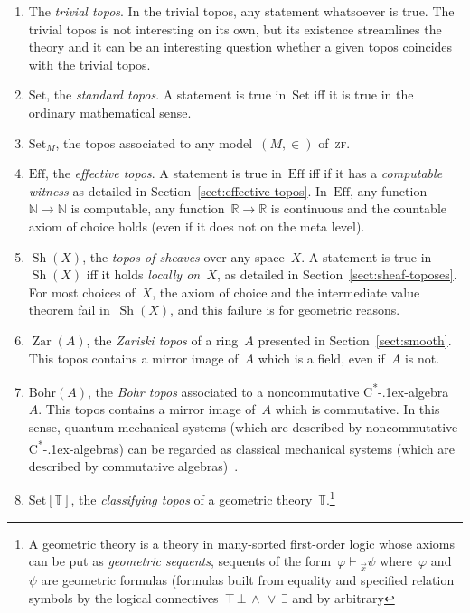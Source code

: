 \documentclass[oneside,reqno]{amsart}
\theoremstyle{definition}
\theoremstyle{plain}
\theoremstyle{remark}
\newcommand{\NN}{\mathbb{N}}
\newcommand{\TT}{\mathbb{T}}
\newcommand{\RR}{\mathbb{R}}
\DeclareMathOperator{\Sh}{Sh}
\DeclareMathOperator{\Zar}{Zar}
\newcommand{\Set}{\mathrm{Set}}
\newcommand{\Eff}{\mathrm{Ef{}f}}
\renewcommand{\_}{\mathpunct{.}\,}
\newcommand{\effective}{ef{}fective\xspace}
\newcommand{\?}{\,{:}\,}
\newcommand{\seq}[1]{\mathrel{\vdash\!\!\!_{#1}}}
\begin{document}
\begin{enumerate}
\item The \emph{trivial topos}. In the trivial topos, any statement whatsoever
is true. The trivial topos is not interesting on its own, but its existence
streamlines the theory and it can be an interesting question whether a given
topos coincides with the trivial topos.
\item $\Set$, the \emph{standard topos}. A statement is true in~$\Set$ iff it is true
in the ordinary mathematical sense.
\item $\Set_M$, the topos associated to any model~$(M,\in)$ of~\textsc{zf}.
\item $\Eff$, the \emph{\effective topos}. A statement is true in~$\Eff$ iff
if it has a \emph{computable witness} as detailed in
Section~\ref{sect:effective-topos}. In~$\Eff$, any function~$\NN \to \NN$ is
computable, any function~$\RR \to \RR$ is continuous and the countable axiom of
choice holds (even if it does not on the meta level).
\item $\Sh(X)$, the \emph{topos of sheaves} over any space~$X$. A statement is true
in~$\Sh(X)$ iff it holds \emph{locally on~$X$}, as detailed in
Section~\ref{sect:sheaf-toposes}. For most choices of~$X$, the
axiom of choice and the intermediate value theorem fail in~$\Sh(X)$, and this
failure is for geometric reasons.
\item $\Zar(A)$, the \emph{Zariski topos} of a ring~$A$ presented in
Section~\ref{sect:smooth}. This topos contains a mirror
image of~$A$ which is a field, even if~$A$ is not.
\item $\mathrm{Bohr}(A)$, the \emph{Bohr topos} associated to a noncommutative
C\textsuperscript{*}\kern-.1ex-algebra~$A$. This topos contains a mirror image
of~$A$ which is commutative. In this sense, quantum mechanical systems (which are
described by noncommutative C\textsuperscript{*}\kern-.1ex-algebras) can be
regarded as classical mechanical systems (which are described by commutative
algebras)~\cite{butterfield-hamilton-isham:bohr,heunen-landsman-spitters:aqt}.
\item $\Set[\TT]$, the \emph{classifying topos} of a geometric theory~$\TT$.\footnote{A
geometric theory is a theory in many-sorted first-order logic whose axioms can be put as \emph{geometric
sequents}, sequents of the form~$\varphi \seq{\vec x} \psi$ where~$\varphi$
and~$\psi$ are geometric formulas (formulas built from equality and specified
relation symbols by the logical
connectives~${\top}\,{\bot}\,{\wedge}\,{\vee}\,{\exists}$ and by arbitrary
}
\end{enumerate}
\end{document}
